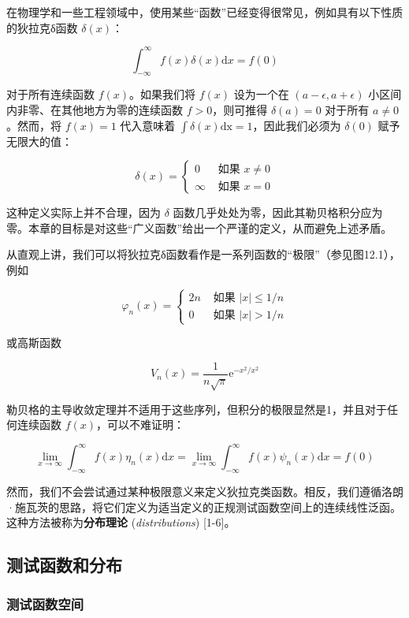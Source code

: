 
在物理学和一些工程领域中，使用某些``函数''已经变得很常见，例如具有以下性质的狄拉克δ函数
\(\delta(x)\)：

\[
\int_{-\infty}^{\infty} f(x) \delta(x) \mathrm{d} x=f(0)
\]

对于所有连续函数 \(f(x)\)。如果我们将 \(f(x)\) 设为一个在
\((a-\epsilon, a+\epsilon)\) 小区间内非零、在其他地方为零的连续函数
\(f > 0\)，则可推得 \(\delta(a) = 0\) 对于所有 \(a \neq 0\)。然而，将
\(f(x)=1\) 代入意味着 \(\int \delta(x) \mathrm{dx}=1\)，因此我们必须为
\(\delta(0)\) 赋予无限大的值：

\[
\delta(x)= \begin{cases}0 & \text { 如果 } x \neq 0 \\ \infty & \text { 如果 } x=0\end{cases}
\]

这种定义实际上并不合理，因为 \(\delta\)
函数几乎处处为零，因此其勒贝格积分应为零。本章的目标是对这些``广义函数''给出一个严谨的定义，从而避免上述矛盾。

从直观上讲，我们可以将狄拉克δ函数看作是一系列函数的``极限''（参见图12.1），例如

\[
\varphi_n(x)= \begin{cases}2 n & \text { 如果 }|x| \leq 1 / n \\ 0 & \text { 如果 }|x|>1 / n\end{cases}
\]

或高斯函数

\[
V_n(x)=\frac{1}{n \sqrt{\pi}} \mathrm{e}^{-x^2 / x^2}
\]

勒贝格的主导收敛定理并不适用于这些序列，但积分的极限显然是1，并且对于任何连续函数
\(f(x)\)，可以不难证明：

\[
\lim _{x \rightarrow \infty} \int_{-\infty}^{\infty} f(x) \eta_n(x) \mathrm{d} x=\lim _{x \rightarrow \infty} \int_{-\infty}^{\infty} f(x) \psi_n(x) \mathrm{d} x=f(0)
\]

然而，我们不会尝试通过某种极限意义来定义狄拉克类函数。相反，我们遵循洛朗·施瓦茨的思路，将它们定义为适当定义的正规测试函数空间上的连续线性泛函。这种方法被称为\textbf{分布理论}
(\emph{distributions}) {[}1-6{]}。

\subsection{测试函数和分布}\label{ux6d4bux8bd5ux51fdux6570ux548cux5206ux5e03}

\subsubsection{测试函数空间}\label{ux6d4bux8bd5ux51fdux6570ux7a7aux95f4}

